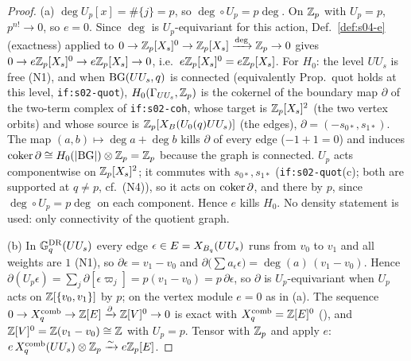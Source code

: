 \begin{proof}
(a) $\deg U_p[x]=\#\{j\}=p$, so $\deg\circ U_p=p\deg$. On $\mathbb{Z}_p$ with $U_p=p$, $p^{n!}\to0$, so $e=0$. Since $\deg$ is $U_p$-equivariant
for this action, Def.~\ref{def:s04-e} (exactness) applied to $0\to\mathbb{Z}_p[X_s]^0\to\mathbb{Z}_p[X_s]\xrightarrow{\deg}\mathbb{Z}_p\to0$ gives
$0\to e\mathbb{Z}_p[X_s]^0\to e\mathbb{Z}_p[X_s]\to0$, i.e.\ $e\mathbb{Z}_p[X_s]^0=e\mathbb{Z}_p[X_s]$.
For $H_0$: the level $UU_s$ is free (N1), and when $\mathrm{BG}(UU_s,q)$ is connected (equivalently Prop.~quot holds at this level,
\texttt{if:s02-quot}), $H_0(\Gamma_{UU_s},\mathbb{Z}_p)$ is the cokernel of the boundary map $\partial$ of the two-term complex of
\texttt{if:s02-coh}, whose target is $\mathbb{Z}_p[X_s]^2$ (the two vertex orbits) and whose source is $\mathbb{Z}_p[X_B(U_0(q)UU_s)]$ (the edges),
$\partial=(-s_{0*},s_{1*})$. The map $(a,b)\mapsto\deg a+\deg b$ kills $\partial$ of every edge ($-1+1=0$) and induces
$\operatorname{coker}\partial\cong H_0(|\mathrm{BG}|)\otimes\mathbb{Z}_p=\mathbb{Z}_p$ because the graph is connected. $U_p$ acts componentwise on $\mathbb{Z}_p[X_s]^2$; it commutes
with $s_{0*},s_{1*}$ (\texttt{if:s02-quot}(c); both are supported at $q\ne p$, cf.\ (N4)), so it acts on $\operatorname{coker}\partial$, and there by
$p$, since $\deg\circ U_p=p\deg$ on each component. Hence $e$ kills $H_0$. No density statement is used: only connectivity of the
quotient graph.

(b) In $\mathbb{G}^{\mathrm{DR}}_q(UU_s)$ every edge $\epsilon\in E=X_{B_q}(UU_s)$ runs from $v_0$ to $v_1$ and all weights are $1$ (N1), so
$\partial\epsilon=v_1-v_0$ and $\partial\big(\sum a_\epsilon\epsilon\big)=\deg(a)\,(v_1-v_0)$. Hence
$\partial(U_p\epsilon)=\sum_j\partial[\epsilon\varpi_j]=p(v_1-v_0)=p\,\partial\epsilon$, so $\partial$ is $U_p$-equivariant when $U_p$
acts on $\mathbb{Z}[\{v_0,v_1\}]$ by $p$; on the vertex module $e=0$ as in (a). The sequence $0\to X^{\mathrm{comb}}_q\to\mathbb{Z}[E]\xrightarrow{\partial}
\mathbb{Z}[V]^0\to0$ is exact with $X^{\mathrm{comb}}_q=\mathbb{Z}[E]^0$ (), and $\mathbb{Z}[V]^0=\mathbb{Z}(v_1-v_0)\cong\mathbb{Z}$ with $U_p=p$. Tensor with
$\mathbb{Z}_p$ and apply $e$: $e\,X^{\mathrm{comb}}_q(UU_s)\otimes\mathbb{Z}_p\xrightarrow{\sim}e\mathbb{Z}_p[E]$.


\end{proof}
